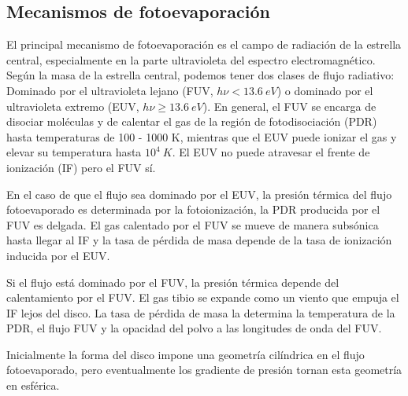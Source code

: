 \subsection{Mecanismos de fotoevaporación \citep{Johnstone:1998}}

El principal mecanismo de fotoevaporación es el campo de radiación de la
estrella central, especialmente en la parte ultravioleta del espectro
electromagnético. Según la masa de la estrella central, podemos tener dos
clases de flujo radiativo: Dominado por el ultravioleta lejano (FUV,
$h\nu < 13.6~eV$) o dominado por el ultravioleta extremo (EUV,
$h\nu \geq 13.6~eV$). En general, el FUV se encarga de disociar moléculas
y de calentar el gas de la región de fotodisociación (PDR) hasta
temperaturas de 100 - 1000 K, mientras que el EUV puede ionizar el gas y
elevar su temperatura hasta $10^4~K$. El EUV no puede atravesar el frente
de ionización (IF) pero el FUV sí.

En el caso de que el flujo sea dominado por el EUV, la presión térmica del
flujo fotoevaporado es determinada por la fotoionización, la PDR producida
por el FUV es delgada. El gas calentado por el FUV se mueve de manera
subsónica hasta llegar al IF y la tasa de pérdida de masa
depende de la tasa de ionización inducida por el EUV.

Si el flujo está dominado por el FUV, la presión térmica depende del
calentamiento por el FUV. El gas tibio se expande como un viento que empuja
el IF lejos del disco. La tasa de pérdida de masa la determina la temperatura
de la PDR, el flujo FUV y la opacidad del polvo a las longitudes de onda del FUV.

Inicialmente la forma del disco impone una geometría cilíndrica en el
flujo fotoevaporado, pero eventualmente los gradiente de presión tornan
esta geometría en esférica.

